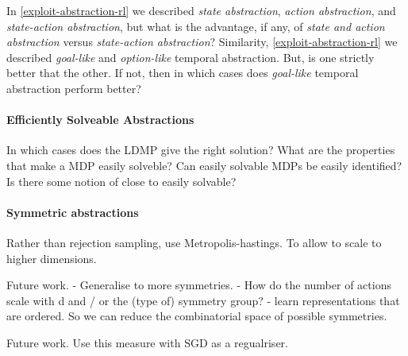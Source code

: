 In \ref{exploit-abstraction-rl} we described \textit{state abstraction}, \textit{action abstraction}, and \textit{state-action abstraction}, but what is the advantage, if any, of \textit{state and action abstraction} versus \textit{state-action abstraction}? Similarity, \ref{exploit-abstraction-rl} we described \textit{goal-like} and \textit{option-like} temporal abstraction. But, is one strictly better that the other. If not, then in which cases does \textit{goal-like} temporal abstraction perform better?

\paragraph{Efficiently Solveable Abstractions}

In which cases does the LDMP give the right solution? What are the properties that make a MDP easily solveble?
Can easily solvable MDPs be easily identified? Is there some notion of close to easily solvable?

\paragraph{Symmetric abstractions}

Rather than rejection sampling, use Metropolis-hastings. To allow to scale to higher dimensions.


Future work.
- Generalise to more symmetries.
- How do the number of actions scale with d and / or the (type of) symmetry group?
- learn representations that are ordered. So we can reduce the combinatorial space of possible symmetries.


Future work.
Use this measure with SGD as a regualriser.


